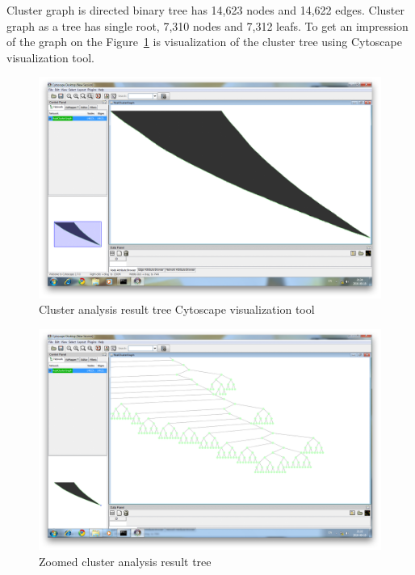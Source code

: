 Cluster graph is directed binary  tree has 14,623 nodes and 14,622 edges. Cluster graph as a tree has single root, 7,310 nodes and 7,312 leafs. To get an impression of the graph on the Figure~\ref{fig:Cytoscape_Cluster_1} is visualization of the cluster tree using Cytoscape~\cite{Cytoscape} visualization tool.

\begin{figure}[h!]
\centering
\includegraphics[scale=0.25]{pictures/Cytoscape_cluster_graph_1.png}
\caption{Cluster analysis result tree Cytoscape visualization tool}
\label{fig:Cytoscape_Cluster_1}
\end{figure}

\begin{figure}[h!]
\centering
\includegraphics[scale=0.25]{pictures/Cytoscape_cluster_graph_2.png}
\caption{Zoomed cluster analysis result tree}
\label{fig:Cytoscape_Cluster_2}
\end{figure}

